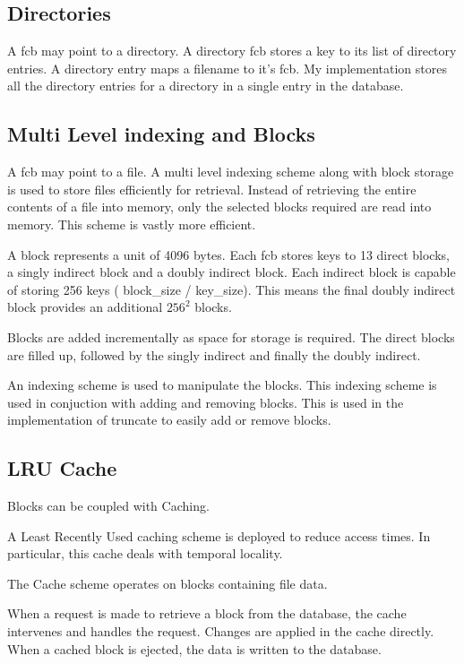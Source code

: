 \documentclass{article}
\begin{document}
\subsection{Directories}

A fcb may point to a directory. A directory fcb stores a key to its list of directory entries. A directory entry maps a filename to it's fcb. My implementation stores all the directory entries for a directory in a single entry in the database.

\subsection{Multi Level indexing and Blocks}

A fcb may point to a file. A multi level indexing scheme along with block storage is used to store files efficiently for retrieval. Instead of retrieving the entire contents of a file into memory, only the selected blocks required are read into memory. This scheme is vastly more efficient.

A block represents a unit of 4096 bytes. Each fcb stores keys to 13 direct blocks, a singly indirect block and a doubly indirect block. Each indirect block is capable of storing 256 keys ( block\_size / key\_size). This means the final doubly indirect block provides an additional $256^2$ blocks.

Blocks are added incrementally as space for storage is required. The direct blocks are filled up, followed by the singly indirect and finally the doubly indirect.

An indexing scheme is used to manipulate the blocks. This indexing scheme is used in conjuction with adding and removing blocks. This is used in the implementation of truncate to easily add or remove blocks.

\subsection{LRU Cache}

Blocks can be coupled with Caching.

A Least Recently Used caching scheme is deployed to reduce access times. In particular, this cache deals with temporal locality.

The Cache scheme operates on blocks containing file data.

When a request is made to retrieve a block from the database, the cache intervenes and handles the request. Changes are applied in the cache directly. When a cached block is ejected, the data is written to the database.
\end{document}

